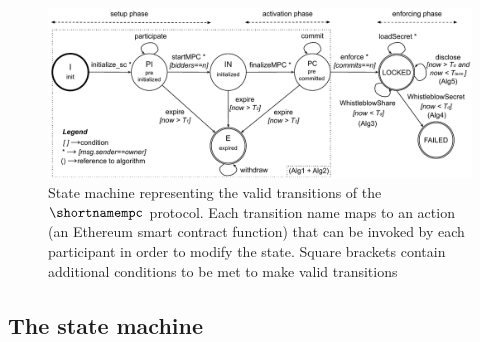 

\begin{figure}[t]
	\centering
	\includegraphics[width=1.0\textwidth]{fig/protocol_fsm_simple_version.pdf}
	\caption{State machine representing the valid transitions of the $\shortnamempc$ protocol. Each transition name maps to an action (an Ethereum smart contract function) that can be invoked by each participant in order to modify the state. Square brackets contain additional conditions to be met to make valid transitions}
	\label{fig:fsm}
\end{figure}

\subsection{The \shortname state machine}\label{sect:ityt_exec}
 
